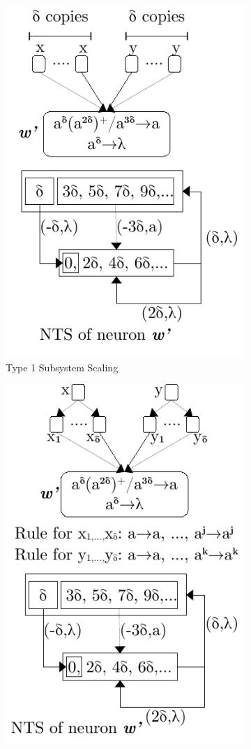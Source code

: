 \documentclass[]{elsarticle}
\theoremstyle{definition}
\theoremstyle{definition}
\begin{document}
\begin{figure}[H]
   \centering
   \begin{subfigure}{.49\textwidth}
      \centering
      \includegraphics[scale=0.65]{fig-lts-4a.pdf}
      \caption{Type 1 Subsystem Scaling}
      \label{fig-nts-4a}
   \end{subfigure}
   \begin{subfigure}{.49\textwidth}
      \centering
      \includegraphics[scale=0.65]{fig-lts-4b.pdf}

\end{subfigure}
\end{figure}
\end{document}
